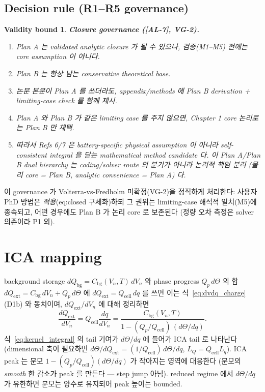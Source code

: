 \documentclass[11pt,a4paper]{article}
\newtheorem*{boundbox}{Validity bound}
\newcommand{\bg}{\mathrm{bg}}
\newcommand{\cell}{\mathrm{cell}}
\newcommand{\ext}{\mathrm{ext}}
\newcommand{\AL}[1]{\textsf{[AL-#1]}}
\begin{document}
\subsection{Decision rule (R1--R5 governance)}\label{sec:decision}
\begin{boundbox}
\textbf{Closure governance (\AL{7}, VG-2).}
\begin{enumerate}[label=\textbf{R\arabic*.}]
\item Plan A 는 \emph{validated analytic closure} 가 될 수 있으나, 검증(M1--M5) 전에는 core
  assumption 이 아니다.
\item Plan B 는 \emph{항상} 남는 conservative theoretical base.
\item 논문 본문이 Plan A 를 쓰더라도, appendix/methods 에 Plan B derivation + limiting-case
  check 를 함께 제시.
\item Plan A 와 Plan B 가 같은 limiting case 를 주지 않으면, Chapter 1 core 논리로는 \emph{Plan
  B 만} 채택.
\item 따라서 Refs 6/7 은 battery-specific physical assumption 이 아니라 self-consistent
  integral 을 닫는 \emph{mathematical method candidate} 다. 이 Plan A/Plan B dual hierarchy
  는 coding/solver route 의 분기가 아니라 \emph{논리적 책임 분리} (물리 core = Plan B,
  analytic convenience = Plan A) 다.
\end{enumerate}
\end{boundbox}
이 governance 가 Volterra-vs-Fredholm 미확정(VG-2)을 정직하게 처리한다: 사용자 PhD 방법은
\emph{적용}(eq:closed 구체화)하되 그 권위는 limiting-case 해석적 일치(M5)에 종속되고, 어떤
경우에도 Plan B 가 논리 core 로 보존된다 (정량 오차 측정은 solver 의존이라 P1 외).

\section{ICA mapping}\label{sec:ica}
background storage $dQ_\bg=C_\bg(V_n,T)\,dV_n$ 와 phase progress $Q_p\,d\Theta$ 의 합
$dQ_\ext=C_\bg\,dV_n+Q_p\,d\Theta$ 에 $dQ_\ext=Q_\cell\,dq$ 를 쓰면 이는 식~\eqref{eq:dvdq_charge}
(D1b) 와 동치이며, $dQ_\ext/dV_n$ 에 대해 정리하면
\begin{equation}
\boxed{\;\frac{dQ_\ext}{dV_n}=Q_\cell\frac{dq}{dV_n}=\frac{C_\bg(V_n,T)}{1-(Q_p/Q_\cell)\,(d\Theta/dq)}.\;}
\label{eq:ica}
\end{equation}
식~\eqref{eq:kernel_integral} 의 tail 기여가 $d\Theta/dq$ 에 들어가 ICA tail 로 나타난다
(dimensional 축이 필요하면 $d\Theta/dQ_\ext=(1/Q_\cell)\,d\Theta/dq$, $L_Q=Q_\cell L_q$).
ICA peak 는 분모 $1-(Q_p/Q_\cell)(d\Theta/dq)$ 가 작아지는 영역에 대응한다 (분모의 \emph{smooth}
한 감소가 peak 를 만든다 — step jump 아님). reduced regime 에서 $d\Theta/dq$ 가 유한하면 분모는
양수로 유지되어 peak 높이는 bounded.
\end{document}
